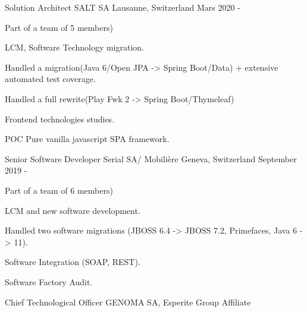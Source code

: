 

\begin{cventries}
        \cventry
        {Solution Architect} %
        {SALT SA} %
        {Lausanne, Switzerland} %
        {Mars 2020 - } %
        {
            \begin{cvitems} %
                \item{Part of a team of 5 members)}
                \item{LCM, Software Technology migration.}
                \item{Handled a migration(Java 6/Open JPA -> Spring Boot/Data) + extensive automated test coverage.}
                \item{Handled a full rewrite(Play Fwk 2 -> Spring Boot/Thymeleaf)}
                \item{Frontend technologies studies.}
                \item{POC Pure vanilla javascript SPA framework.}
            \end{cvitems}
        }
        \cventry
        {Senior Software Developer} %
        {Serial SA/ Mobilière} %
        {Geneva, Switzerland} %
        {September 2019 - } %
        {
            \begin{cvitems} %
                \item{Part of a team of 6 members)}
                \item{LCM and new software development.}
                \item{Handled two software migrations (JBOSS 6.4 -> JBOSS 7.2, Primefaces, Java 6 -> 11).}
                \item{Software Integration (SOAP, REST).}
                \item{Software Factory Audit.}
            \end{cvitems}
        }
        \cventry
        {Chief Technological Officer} %
        {GENOMA SA, Esperite Group Affiliate} %

\end{cventries}
